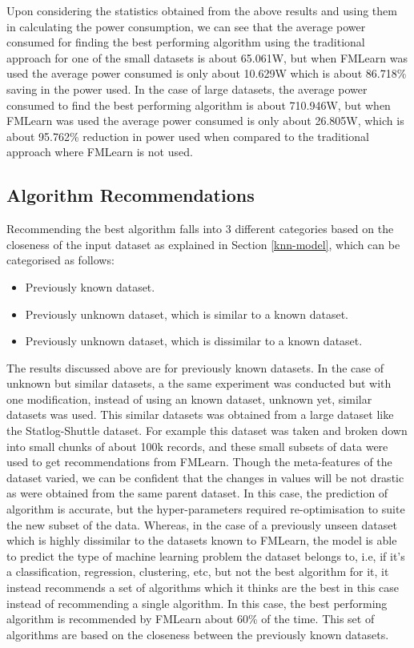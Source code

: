 Upon considering the statistics obtained from the above results and using them in calculating the power consumption, we can see that the average power consumed for finding the best performing algorithm using the traditional approach for one of the small datasets is about 65.061W, but when FMLearn was used the average power consumed is only about 10.629W which is about 86.718\% saving in the power used. In the case of large datasets, the average power consumed to find the best performing algorithm is about 710.946W, but when FMLearn was used the average power consumed is only about 26.805W, which is about 95.762\% reduction in power used when compared to the traditional approach where FMLearn is not used.

\subsection*{Algorithm Recommendations}

Recommending the best algorithm falls into 3 different categories based on the closeness of the input dataset as explained in Section \ref{knn-model}, which can be categorised as follows:
\begin{itemize}
    \item Previously known dataset.
    \item Previously unknown dataset, which is similar to a known dataset.
    \item Previously unknown dataset, which is dissimilar to a known dataset.
\end{itemize}

The results discussed above are for previously known datasets. In the case of unknown but similar datasets, a the same experiment was conducted but with one modification, instead of using an known dataset, unknown yet, similar datasets was used. This similar datasets was obtained from a large dataset like the Statlog-Shuttle dataset. For example this dataset was taken and broken down into small chunks of about 100k records, and these small subsets of data were used to get recommendations from FMLearn. Though the meta-features of the dataset varied, we can be confident that the changes in values will be not drastic as were obtained from the same parent dataset. In this case, the prediction of algorithm is accurate, but the hyper-parameters required re-optimisation to suite the new subset of the data. Whereas, in the case of a previously unseen dataset which is highly dissimilar to the datasets known to FMLearn, the model is able to predict the type of machine learning problem the dataset belongs to, i.e, if it's a classification, regression, clustering, etc, but not the best algorithm for it, it instead recommends a set of algorithms which it thinks are the best in this case instead of recommending a single algorithm. In this case, the best performing algorithm is recommended by FMLearn about 60\% of the time. This set of algorithms are based on the closeness between the previously known datasets.